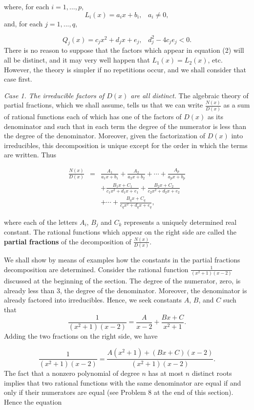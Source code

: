 \noindent where, for each $i = 1, . . ., p$,
$$
L_i(x) = a_{i}x + b_{i}, \;\;\; a_i \neq 0, 
$$
\noindent and, for each $j = 1, . . ., q$,

$$
Q_j(x) = c_{j}x^2 + d_{j} x + e_{j}, \;\;\; d_{j}^2 - 4c_{j}e_{j} < 0.
$$
\noindent There is no reason to suppose that the factors which appear in equation (2) will all be distinct, and it may very well happen that 
$L_{1}(x) = L_{2}(x)$, etc.
However, the theory is simpler if no repetitions occur, and we shall consider that case first.

\textit{Case 1. The irreducible factors of $D(x)$ are all distinct.}  
The algebraic theory of partial fractions, which we shall assume, tells us that we can write $\frac{N(x)}{D(x)}$ as a sum of rational functions each of which has one of the factors of $D(x)$ as its denominator and such that in each term the degree of the numerator is less than the degree of the denominator. Moreover, given the factorization of $D(x)$ into irreducibles, this decomposition is unique except for the order in which the terms are written. Thus

\begin{eqnarray*}
\frac{N(x)}{D(x)} &=& \frac{A_1}{a_{1}x + b_{1}} + \frac{A_2}{a_{2}x + b_{2}} + \cdots + \frac{A_p}{a_{p}x + b_{p}}\\
&& + \frac{B_{1}x + C_1} {c_{1}x^2 + d_{1}x + e_{1}} + \frac{B_{2}x + C_2}{c_{2}x^2 + d_{2}x + e_2}\\
&& + \cdots 
+ \frac{B_{q}x + C_q}{c_{q}x^2 + d_{q}x + e_q},
\end{eqnarray*}

\noindent where each of the letters $A_i$, $B_j$ and $C_k$ represents a uniquely determined real constant. The rational functions which appear on the right side are called the \textbf{partial fractions} of the decomposition of $\frac{N(x)}{D(x)}$.

We shall show by means of examples how the constants in the partial fractions decomposition are determined. Consider the rational function
$\frac{1}{(x^2 + 1)(x - 2)}$ discussed at the beginning of the section. The degree of the numerator, zero, is already less than 3, the degree of the denominator. Moreover, the denominator is already factored into irreducibles. Hence, we seek constants $A$, $B$, and $C$ such that
$$
\frac{1}{(x^2 + 1)(x - 2)} = \frac{A}{x - 2} + \frac{Bx + C}{x^2 + 1}.
$$
\noindent Adding the two fractions on the right side, we have

$$
\frac{1}{(x^2 + 1)(x - 2)} = \frac{A(x^2 + 1) + (Bx + C)(x - 2)}{(x^2 + 1)(x - 2)}.
$$
\noindent The fact that a nonzero polynomial of degree $n$ has at most $n$ distinct roots implies that two rational functions with the same denominator are equal if and only if their numerators are equal (see Problem 8 at the end of this section). Hence the equation

